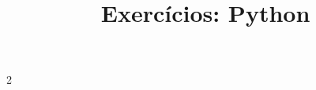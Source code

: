 \documentclass[12pt]{article}
\title{\textbf{Exercícios}: Python}
\author{Aula #1}
\date{}
\begin{document}
	\sffamily
	\maketitle
	
	\begin{multicols}{2}
					
		
		\vfill 	
		\hfill 
	\end{multicols}
	
\end{document}
